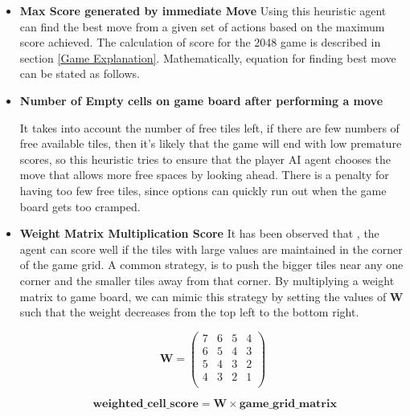 \documentclass{svproc}
\begin{document}
    \begin{itemize}
        \item \textbf{{Max Score generated by immediate Move}}
        Using this heuristic agent can find the best move from a given set of actions based on the maximum score achieved. The calculation of score for the 2048 game is described in section \ref{Game Explanation}.
        Mathematically, equation for finding best move can be stated as follows.


        \item {\textbf{Number of Empty cells on game board after performing a move}}

        It takes into account the number of free tiles left, if there are few numbers of free available tiles, then it’s likely that the game will end with low premature scores, so this heuristic tries to ensure that the player AI agent chooses the move that allows more free spaces by looking ahead. There is a penalty for having too few free tiles, since options can quickly run out when the game board gets too cramped.


        \item {\textbf{Weight Matrix Multiplication Score}}
        It has been observed that \cite{blog_2048_weight_matrix}, the agent can score well if the tiles with large values are maintained in the corner of the game grid. A common strategy, is to push the bigger tiles near any one corner and the smaller tiles away from that corner. By multiplying a weight matrix to game board, we can mimic this strategy by setting the values of \textbf{W} such that the weight decreases from the top left to the bottom right.


        \begin{equation}
            \textbf{W} =
            \begin{pmatrix}
                7 & 6 & 5 & 4 \\
                6 & 5 & 4 & 3\\
                5 & 4 & 3 & 2 \\
                4 & 3 & 2 & 1 \\
            \end{pmatrix}
        \end{equation}

        \begin{equation} \label{weighted_score_equation}
        \textbf{ weighted\_cell\_score} = \textbf{W} \times \textbf{game\_grid\_matrix}
        \end{equation}


\end{itemize}
\end{document}
